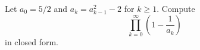 Let $a_0=5/2$ and $a_k=a_{k-1}^2-2$ for $k\ge 1.$ Compute \[\prod_{k=0}^{\infty}\left(1-\frac1{a_k}\right)\] in closed form.